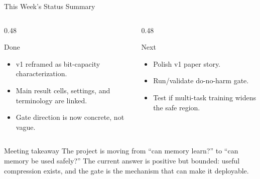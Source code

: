 \begin{frame}{This Week's Status Summary}
  \begin{columns}[T]
    \begin{column}{0.48\textwidth}
      \begin{block}{Done}
        \begin{itemize}
          \item v1 reframed as bit-capacity characterization.
          \item Main result cells, settings, and terminology are linked.
          \item Gate direction is now concrete, not vague.
        \end{itemize}
      \end{block}
    \end{column}
    \begin{column}{0.48\textwidth}
      \begin{block}{Next}
        \begin{itemize}
          \item Polish v1 paper story.
          \item Run/validate do-no-harm gate.
          \item Test if multi-task training widens the safe region.
        \end{itemize}
      \end{block}
    \end{column}
  \end{columns}
  \vspace{0.6em}
  \begin{block}{Meeting takeaway}
    The project is moving from ``can memory learn?'' to ``can memory be used
    safely?'' The current answer is positive but bounded: useful compression
    exists, and the gate is the mechanism that can make it deployable.
  \end{block}
\end{frame}

